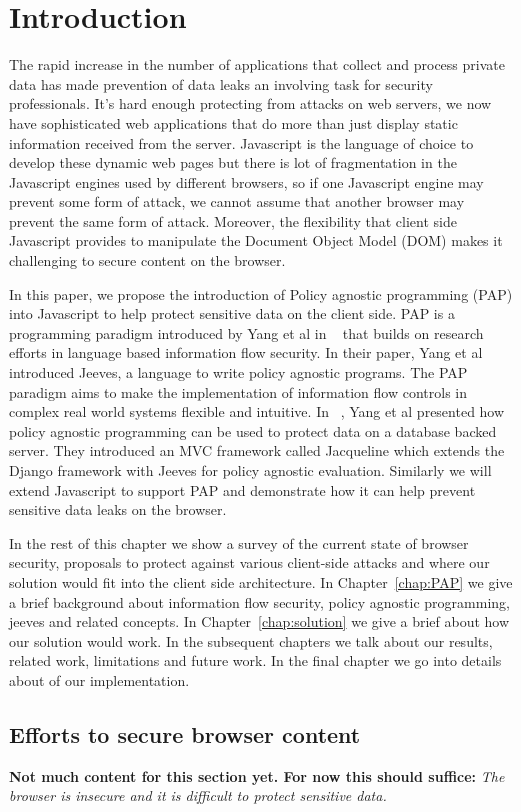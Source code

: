 \chapter{Introduction\label{chap:intro}}

The rapid increase in the number of applications that collect and process private
data has made prevention of data leaks an involving task for security professionals.
It's hard enough protecting from attacks on web servers, we now have sophisticated
web applications that do more than just display static information received from
the server. Javascript is the language of choice to develop these dynamic web pages
but there is lot of fragmentation in the Javascript engines used by different browsers,
so if one Javascript engine may prevent some form of attack, we cannot assume
that another browser may prevent the same form of attack. Moreover, the flexibility
that client side Javascript provides to manipulate the Document Object Model (DOM)
makes it challenging to secure content on the browser.

In this paper, we propose the introduction of Policy agnostic programming (PAP)
into Javascript to help protect sensitive data on the client side. PAP is a
programming paradigm introduced by Yang et al in ~\cite{Jeeves} that builds on
research efforts in language based information flow security. In their paper,
Yang et al introduced Jeeves, a language to write policy agnostic programs. The
PAP paradigm aims to make the implementation of information flow controls in complex
real world systems flexible and intuitive. In ~\cite{Jacqueline}, Yang et al
presented how policy agnostic programming can be used to protect data on a database
backed server. They introduced an MVC framework called Jacqueline which extends
the Django framework with Jeeves for policy agnostic evaluation. Similarly we will
extend Javascript to support PAP and demonstrate how it can help prevent sensitive
data leaks on the browser.

In the rest of this chapter we show a survey of the current state of browser security,
proposals to protect against various client-side attacks and where our solution
would fit into the client side architecture. In Chapter~\ref{chap:PAP} we give a brief background
about information flow security, policy agnostic programming, jeeves and related
concepts. In Chapter~\ref{chap:solution} we give a brief about how our solution would work. In the
subsequent chapters we talk about our results, related work, limitations and future
work. In the final chapter we go into details about of our implementation.

\section{Efforts to secure browser content}
\textbf{Not much content for this section yet. For now this should suffice:}
\textit{The browser is insecure and it is difficult to protect sensitive data.}
